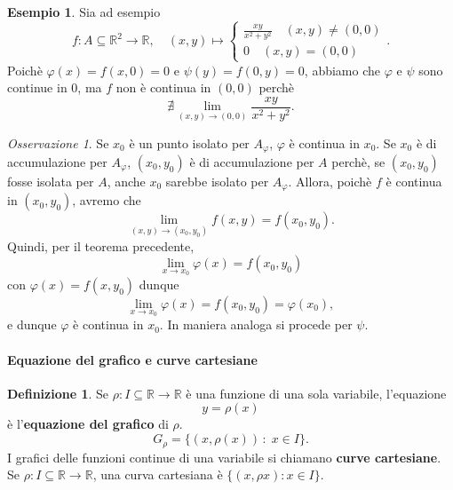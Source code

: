 \documentclass{article}
\theoremstyle{plain}
\theoremstyle{definition}
\newtheorem{defn}{Definizione}[section]
\newtheorem{exmp}{Esempio}[section]
\theoremstyle{remark}
\newtheorem{rem}{Osservazione}
\begin{document}
\vspace{10pt}

\begin{exmp}
Sia ad esempio 
\[f:A\subseteq\mathbb{R}^2\to\mathbb{R},\quad (x,y)\mapsto\begin{cases}
    \frac{xy}{x^2+y^2}\quad (x,y)\neq(0,0)\\
    0\quad (x,y)=(0,0)
\end{cases}.\]
Poichè \(\varphi(x)=f(x,0)=0\) e  \(\psi(y)=f(0,y)=0\), abbiamo che 
$\varphi$ e $\psi$ sono continue in $0$, ma $f$ non è continua in $(0,0)$ perchè 
\[\nexists\lim_{(x,y)\to(0,0)}\dfrac{xy}{x^2+y^2}.\]
\end{exmp}

\vspace{10pt}

\begin{rem}
    Se $x_0$ è un punto isolato per $A_\varphi$, $\varphi$ è continua in $x_0$. 
    Se $x_0$ è di accumulazione per $A_\varphi$, $(x_0,y_0)$ è di accumulazione per $A$ perchè, se $(x_0,y_0)$ fosse isolata per $A$, anche $x_0$ sarebbe isolato per $A_\varphi$.
    Allora, poichè $f$ è continua in $(x_0,y_0)$, avremo che \[\lim_{(x,y)\to(x_0,y_0)}f(x,y)=f(x_0,y_0).\]
    Quindi, per il teorema precedente, 
    \[\lim_{x\to x_0}\varphi(x)=f(x_0,y_0)\] con $\varphi(x)=f(x,y_0)$ dunque 
    \[\lim_{x\to x_0}\varphi(x)=f(x_0,y_0)=\varphi(x_0), \]
    e dunque $\varphi$ è continua in $x_0$.
    In maniera analoga si procede per $\psi$.
\end{rem}

\vspace{10pt}

\paragraph{Equazione del grafico e curve cartesiane}
\begin{bxthm}
\begin{defn}
    Se $\rho :I\subseteq\mathbb{R}\to\mathbb{R} $ è una funzione di una sola variabile, l'equazione 
    \[y=\rho(x)\]
    è l'\textbf{equazione del grafico} di $\rho$.
    \[G_\rho=\{(x,\rho(x))\,:\;x\in I\}.\]
    I grafici delle funzioni continue di una variabile si chiamano \textbf{curve cartesiane}. 
    Se $\rho :I\subseteq\mathbb{R}\to\mathbb{R}$, una curva cartesiana è $\{(x,\rho x):x\in I\}$.    
\end{defn}
\end{bxthm}

\vspace{10pt}
\end{document}

